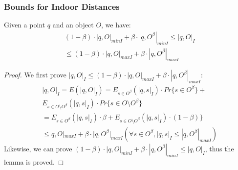 \begin{frame}
\begin{columns}[c]
  \begin{example}
  \end{example}

\end{columns}

\end{frame}


\begin{frame}
\frametitle{Bounds for Indoor Distances}

\begin{lemma}
  \tiny
  Given a point $q$ and an object $O$, we have:
  \begin{equation*}
    \begin{split}
    & (1 - \beta) \cdot |q, O|_{minI} + \beta \cdot |q, O^\beta|_{minI} \leq |q, O|_I  \\
    & \leq (1 - \beta) \cdot |q, O|_{maxI} + \beta \cdot |q, O^\beta|_{maxI}
    \end{split}
  \end{equation*}
\end{lemma}

\begin{proof}{\small}
  \tiny
  We first prove $|q, O|_I \leq (1 - \beta) \cdot |q, O|_{maxI} + \beta \cdot |q, O^\beta|_{maxI}$:
  \begin{equation*}
    \begin{split}
      & |q, O|_I = E(|q, O|_I) = E_{s \in O^\beta}(|q, s|_I) \cdot Pr\{s \in O^\beta \} + \\
      & E_{s \in O \setminus O^\beta} (|q, s|_I) \cdot Pr\{s \in O \setminus O^\beta \} \\
      & = E_{s \in O^\beta}(|q, s|_I) \cdot \beta + E_{s \in O \setminus O^\beta} (|q, s|_I) \cdot (1 - \beta) \} \\
      & \leq q, O|_{maxI} + \beta \cdot |q, O^\beta|_{maxI} (\forall s \in O^\beta, |q,s|_I \leq |q, O^\beta|_{maxI})
    \end{split}
  \end{equation*}
  Likewise, we can prove $(1 - \beta) \cdot |q, O|_{minI} + \beta \cdot |q, O^\beta|_{minI} \leq |q, O|_I$, thus the lemma is proved.
\end{proof}

\end{frame}

